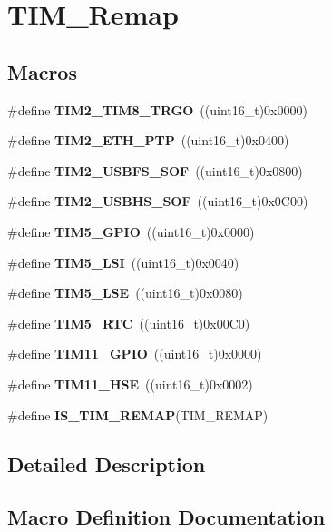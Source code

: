 \section{T\+I\+M\+\_\+\+Remap}
\label{group__TIM__Remap}
\subsection*{Macros}
\begin{DoxyCompactItemize}
\item 
\#define \textbf{ T\+I\+M2\+\_\+\+T\+I\+M8\+\_\+\+T\+R\+GO}~((uint16\+\_\+t)0x0000)
\item 
\#define \textbf{ T\+I\+M2\+\_\+\+E\+T\+H\+\_\+\+P\+TP}~((uint16\+\_\+t)0x0400)
\item 
\#define \textbf{ T\+I\+M2\+\_\+\+U\+S\+B\+F\+S\+\_\+\+S\+OF}~((uint16\+\_\+t)0x0800)
\item 
\#define \textbf{ T\+I\+M2\+\_\+\+U\+S\+B\+H\+S\+\_\+\+S\+OF}~((uint16\+\_\+t)0x0\+C00)
\item 
\#define \textbf{ T\+I\+M5\+\_\+\+G\+P\+IO}~((uint16\+\_\+t)0x0000)
\item 
\#define \textbf{ T\+I\+M5\+\_\+\+L\+SI}~((uint16\+\_\+t)0x0040)
\item 
\#define \textbf{ T\+I\+M5\+\_\+\+L\+SE}~((uint16\+\_\+t)0x0080)
\item 
\#define \textbf{ T\+I\+M5\+\_\+\+R\+TC}~((uint16\+\_\+t)0x00\+C0)
\item 
\#define \textbf{ T\+I\+M11\+\_\+\+G\+P\+IO}~((uint16\+\_\+t)0x0000)
\item 
\#define \textbf{ T\+I\+M11\+\_\+\+H\+SE}~((uint16\+\_\+t)0x0002)
\item 
\#define \textbf{ I\+S\+\_\+\+T\+I\+M\+\_\+\+R\+E\+M\+AP}(T\+I\+M\+\_\+\+R\+E\+M\+AP)
\end{DoxyCompactItemize}


\subsection{Detailed Description}


\subsection{Macro Definition Documentation}
\mbox{\label{group__TIM__Remap_ga7faab73212e996d8b49555d3ad5be965}} 

